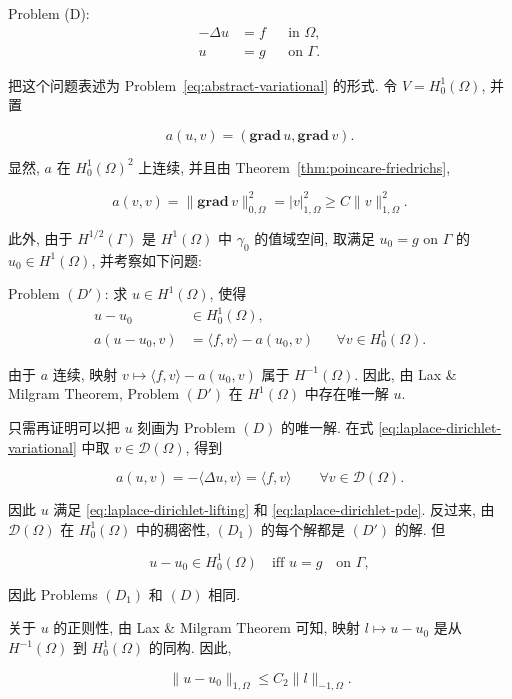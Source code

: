 \noindent Problem (D):
\begin{align}
-\Delta u&=f&&\text{in }\Omega,\label{eq:laplace-dirichlet-pde}\\
u&=g&&\text{on }\Gamma.\label{eq:laplace-dirichlet-boundary}
\end{align}

把这个问题表述为 Problem~\eqref{eq:abstract-variational} 的形式. 令 $V=H_0^1(\Omega)$, 并置

\[
a(u,v)=(\mathbf{grad}\,u,\mathbf{grad}\,v).
\]

显然, $a$ 在 $H_0^1(\Omega)^2$ 上连续, 并且由
Theorem~\ref{thm:poincare-friedrichs},

\[
a(v,v)=\|\mathbf{grad}\,v\|_{0,\Omega}^2=|v|_{1,\Omega}^2\geq C\|v\|_{1,\Omega}^2.
\]

此外, 由于 $H^{1/2}(\Gamma)$ 是 $H^1(\Omega)$ 中 $\gamma_0$ 的值域空间, 取满足 $u_0=g$ on $\Gamma$ 的 $u_0\in H^1(\Omega)$, 并考察如下问题:

\noindent Problem $(D')$: 求 $u\in H^1(\Omega)$, 使得
\begin{align}
u-u_0&\in H_0^1(\Omega),\label{eq:laplace-dirichlet-lifting}\\
a(u-u_0,v)&=\langle f,v\rangle-a(u_0,v)
&&\forall v\in H_0^1(\Omega).\label{eq:laplace-dirichlet-variational}
\end{align}

由于 $a$ 连续, 映射 $v\mapsto\langle f,v\rangle-a(u_0,v)$ 属于 $H^{-1}(\Omega)$.
因此, 由 Lax \& Milgram Theorem, Problem $(D')$ 在 $H^1(\Omega)$ 中存在唯一解 $u$.

只需再证明可以把 $u$ 刻画为 Problem $(D)$ 的唯一解. 在式
\eqref{eq:laplace-dirichlet-variational} 中取 $v\in\mathcal D(\Omega)$, 得到

\[
a(u,v)=-\langle\Delta u,v\rangle=\langle f,v\rangle\qquad\forall v\in\mathcal D(\Omega).
\]

因此 $u$ 满足 \eqref{eq:laplace-dirichlet-lifting} 和 \eqref{eq:laplace-dirichlet-pde}.
反过来, 由 $\mathcal D(\Omega)$ 在 $H_0^1(\Omega)$ 中的稠密性, $(D_1)$ 的每个解都是 $(D')$ 的解. 但

\[
u-u_0\in H_0^1(\Omega)\quad\text{iff }u=g\quad\text{on }\Gamma,
\]

因此 Problems $(D_1)$ 和 $(D)$ 相同.


关于 $u$ 的正则性, 由 Lax \& Milgram Theorem 可知, 映射 $l\mapsto u-u_0$ 是从
$H^{-1}(\Omega)$ 到 $H_0^1(\Omega)$ 的同构. 因此,

\[
\|u-u_0\|_{1,\Omega}\leq C_2\|l\|_{-1,\Omega}.
\]

